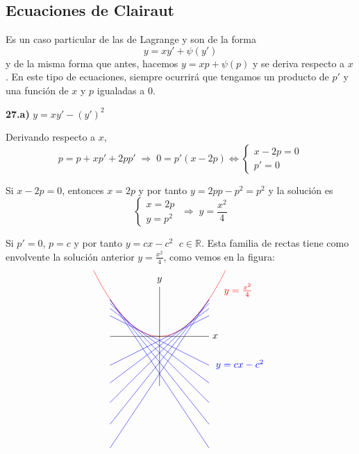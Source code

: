 \subsection{Ecuaciones de Clairaut}
Es un caso particular de las de Lagrange y son de la forma
$$y=xy'+\psi(y')$$
y de la misma forma que antes, hacemos $y=xp+\psi(p)$ y se deriva respecto a $x$. En este tipo de ecuaciones, siempre ocurrirá que tengamos un producto de $p'$ y una función de $x$ y $p$ igualadas a 0.
\begin{ejer}
    \textbf{27.a)} $y=xy'-(y')^2$
\end{ejer}
\begin{sol}
    Derivando respecto a $x$,
    $$p=p+xp'+2pp'\; \Rightarrow \; 0=p'(x-2p) \iff \left\{ \begin{array}{l}
         x-2p=0  \\
         p'=0
    \end{array}\right.$$
    
    Si $x-2p=0$, entonces $x=2p$ y por tanto $y=2pp-p^2=p^2$ y la solución es 
    $$\left\{\begin{array}{cc}
         x=2p  \\
         y=p^2
    \end{array}\right. \; \Rightarrow \; \boxed{y=\dfrac{x^2}{4}}$$

    Si $p'=0$, $p=c$ y por tanto $\boxed{y=cx-c^2}$ $\; c \in \mathbb R$. Esta familia de rectas tiene como envolvente la solución anterior $y=\frac{x^2}{4}$, como vemos en la figura:
$$\begin{tikzpicture}[scale=0.6]
  \foreach \c in {-1.5,-1.25,-1,-0.75,-0.5,0.5,0.75,1,1.25,1.5} {
    \draw[blue, domain=-3:3] plot (\x, {\x*\c - \c*\c});
  }
  \draw[red, domain=-4:4, smooth, samples=100] plot (\x, {\x*\x/4});
  \draw[-] (-3,0) -- (3,0) node[right] {$x$};
  \draw[-] (0,-3) -- (0,3) node[above] {$y$};
   \draw (3.2,-1.7) node[right,blue] {$y=cx-c^2$};
  \draw (3.7,2.8) node[right,red] {$y=\frac{x^2}{4}$};
\end{tikzpicture}$$
\end{sol}

